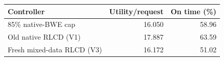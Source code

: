 \begin{tabular}{lrr}
\toprule
Controller & Utility/request & On time (\%)\\
\midrule
85\% native-BWE cap & 16.050 & 58.96\\
Old native RLCD (V1) & 17.887 & 63.59\\
Fresh mixed-data RLCD (V3) & 16.172 & 51.02\\
\bottomrule
\end{tabular}
